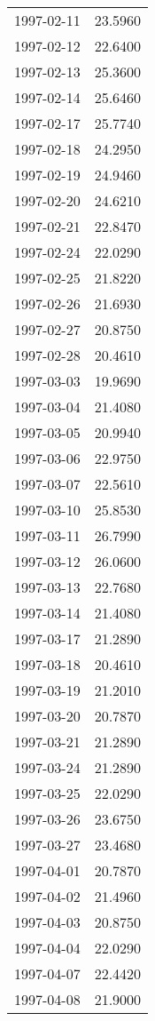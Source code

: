 \begin{tabular}{lr}
1997-02-11 &     23.5960 \\
1997-02-12 &     22.6400 \\
1997-02-13 &     25.3600 \\
1997-02-14 &     25.6460 \\
1997-02-17 &     25.7740 \\
1997-02-18 &     24.2950 \\
1997-02-19 &     24.9460 \\
1997-02-20 &     24.6210 \\
1997-02-21 &     22.8470 \\
1997-02-24 &     22.0290 \\
1997-02-25 &     21.8220 \\
1997-02-26 &     21.6930 \\
1997-02-27 &     20.8750 \\
1997-02-28 &     20.4610 \\
1997-03-03 &     19.9690 \\
1997-03-04 &     21.4080 \\
1997-03-05 &     20.9940 \\
1997-03-06 &     22.9750 \\
1997-03-07 &     22.5610 \\
1997-03-10 &     25.8530 \\
1997-03-11 &     26.7990 \\
1997-03-12 &     26.0600 \\
1997-03-13 &     22.7680 \\
1997-03-14 &     21.4080 \\
1997-03-17 &     21.2890 \\
1997-03-18 &     20.4610 \\
1997-03-19 &     21.2010 \\
1997-03-20 &     20.7870 \\
1997-03-21 &     21.2890 \\
1997-03-24 &     21.2890 \\
1997-03-25 &     22.0290 \\
1997-03-26 &     23.6750 \\
1997-03-27 &     23.4680 \\
1997-04-01 &     20.7870 \\
1997-04-02 &     21.4960 \\
1997-04-03 &     20.8750 \\
1997-04-04 &     22.0290 \\
1997-04-07 &     22.4420 \\
1997-04-08 &     21.9000 \\

\end{tabular}
